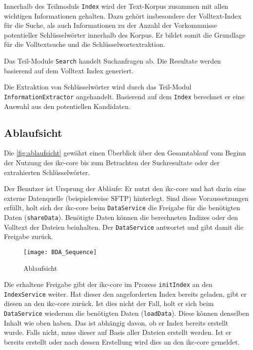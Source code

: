 Innerhalb des Teilmoduls \texttt{Index} wird der Text-Korpus zusammen mit allen wichtigen Informationen gehalten. Dazu gehört insbesondere der Volltext-Index für die Suche, als auch Informationen zu der Anzahl der Vorkommnisse potentieller Schlüsselwörter innerhalb des Korpus. Er bildet somit die Grundlage für die Volltextsuche und die Schlüsselwortextraktion.

Das Teil-Module \texttt{Search} handelt Suchanfragen ab. Die Resultate werden basierend auf dem Volltext Index generiert. 

Die Extraktion von Schlüsselwörter wird durch das Teil-Modul \texttt{In\-for\-ma\-tion\-Ex\-trac\-tor} angehandelt. Basierend auf dem \texttt{Index} berechnet er eine Auswahl aus den potentiellen Kandidaten.

\newpage

\subsection{Ablaufsicht}

Die \autoref{fig:ablaufsicht} gewährt einen Überblick über den Gesamtablauf vom Beginn der Nutzung des \gls{ikc-core} bis zum Betrachten der Suchresultate oder der extrahierten Schlüsselwörter. 

Der Benutzer ist Ursprung der Abläufe: Er nutzt den \gls{ikc-core} und hat darin eine externe Datenquelle (beispielsweise \gls{SFTP}) hinterlegt. Sind diese Voraussetzungen erfüllt, holt sich der \gls{ikc-core} beim \texttt{Da\-ta\-Ser\-vice} die Freigabe für die benötigten Daten (\texttt{shareData}). Benötigte Daten können die berechneten Indizes oder den Volltext der Dateien beinhalten. Der \texttt{DataService} antwortet und gibt damit die Freigabe zurück. 

\begin{figure}[h]
\centering
\texttt{[image: BDA\_Sequence]}
\caption{Ablaufsicht}
\label{fig:ablaufsicht}
\end{figure}

Die erhaltene Freigabe gibt der \gls{ikc-core} im Prozess \texttt{initIndex} an den \texttt{IndexService} weiter. Hat dieser den angeforderten Index bereits geladen, gibt er diesen an den \gls{ikc-core} zurück. Ist dies nicht der Fall, holt er sich beim \texttt{Data\-Service} wiederum die benötigten Daten (\texttt{loadData}). Diese können denselben Inhalt wie oben haben. Das ist abhängig davon, ob er Index bereits erstellt wurde. Falls nicht, muss dieser auf Basis aller Dateien erstellt werden. Ist er bereits erstellt oder nach dessen Erstellung wird dies an den \gls{ikc-core} gemeldet.

